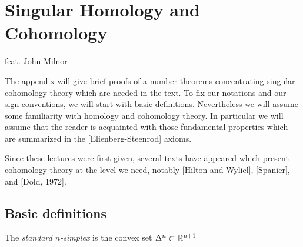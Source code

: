 \section{Singular Homology and Cohomology}
feat. John Milnor

The appendix will give brief proofs of a number theorems concentrating singular cohomology theory which are needed in the text. To fix our notations and our sign conventions, we will start with basic definitions. Nevertheless we will assume some familiarity with homology and cohomology theory. In particular we will assume that the reader is acquainted with those fundamental properties which are summarized in the [Elienberg-Steenrod] axioms.

Since these lectures were first given, several texts have appeared which present cohomology theory at the level we need, notably [Hilton and Wyliel], [Spanier], and [Dold, 1972].

 \subsection{Basic definitions}
 The {\it standard $n$-simplex} is the convex set $\Delta^n\subset \mathbb{R}^{n+1}$
